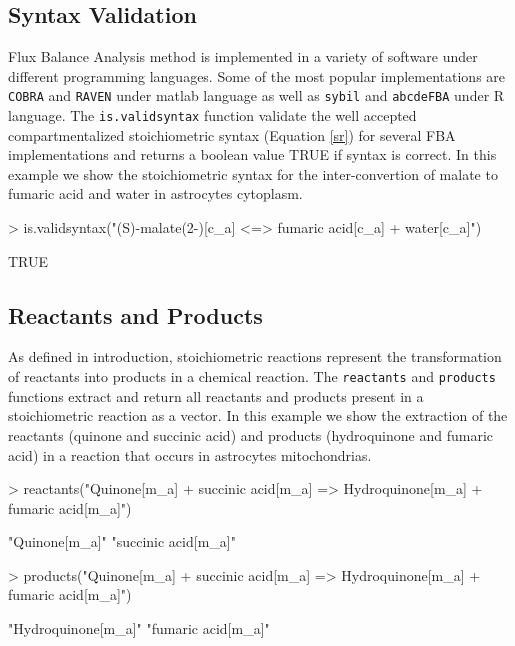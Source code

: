 \subsection{Syntax Validation}
Flux Balance Analysis method is implemented in a variety of software under different programming languages. Some of the most popular implementations are \texttt{COBRA} \cite{Becker2007} and \texttt{RAVEN} \cite{Agren2013} under matlab language as well as \texttt{sybil} and \texttt{abcdeFBA} under R language. The \texttt{is.validsyntax} function validate the well accepted compartmentalized stoichiometric syntax (Equation \ref{sr}) for several FBA implementations and returns a boolean value TRUE if syntax is correct. In this example we show the stoichiometric syntax for the inter-convertion of  malate to fumaric acid and water in astrocytes cytoplasm.
\begin{Schunk}
\begin{Sinput}
> is.validsyntax("(S)-malate(2-)[c_a] <=> fumaric acid[c_a] + water[c_a]")
\end{Sinput}
\begin{Soutput}
[1] TRUE
\end{Soutput}
\end{Schunk}
\subsection{Reactants and Products}
As defined in introduction, stoichiometric reactions represent the transformation of reactants into products in a chemical reaction. The \texttt{reactants} and \texttt{products} functions extract and return all reactants and products present in a stoichiometric reaction  as a vector. In this example we show the extraction of the reactants (quinone and succinic acid) and products (hydroquinone and fumaric acid) in a reaction that occurs in astrocytes mitochondrias.
\begin{Schunk}
\begin{Sinput}
> reactants("Quinone[m_a] + succinic acid[m_a] => Hydroquinone[m_a] + fumaric acid[m_a]")
\end{Sinput}
\begin{Soutput}
[1] "Quinone[m_a]"       "succinic acid[m_a]"
\end{Soutput}
\begin{Sinput}
> products("Quinone[m_a] + succinic acid[m_a] => Hydroquinone[m_a] + fumaric acid[m_a]")
\end{Sinput}
\begin{Soutput}
[1] "Hydroquinone[m_a]" "fumaric acid[m_a]"
\end{Soutput}
\end{Schunk}

